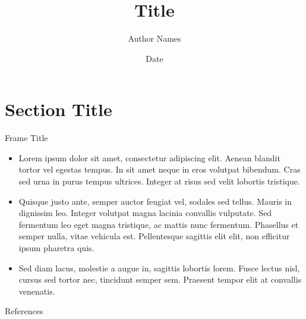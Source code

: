 \documentclass[leqno,presentation]{beamer}
\title[Short Title]{Title}
\author[Short Author Names]{Author Names}
\date[Short Date]{Date}
\begin{document}
\begin{frame}
	\titlepage
\end{frame}

\section{Section Title}
\begin{frame}{Frame Title}
\begin{itemize}
\item Lorem ipsum dolor sit amet, consectetur adipiscing elit. Aenean blandit tortor vel egestas tempus. In sit amet neque in eros volutpat bibendum. Cras sed urna in purus tempus ultrices. Integer at risus sed velit lobortis tristique.
\item Quisque justo ante, semper auctor feugiat vel, sodales sed tellus. Mauris in dignissim leo. Integer volutpat magna lacinia convallis vulputate. Sed fermentum leo eget magna tristique, ac mattis nunc fermentum. Phasellus et semper nulla, vitae vehicula est. Pellentesque sagittis elit elit, non efficitur ipsum pharetra quis.
\item Sed diam lacus, molestie a augue in, sagittis lobortis lorem. Fusce lectus nisl, cursus sed tortor nec, tincidunt semper sem. Praesent tempor elit at convallis venenatis.
\end{itemize}
\end{frame}

\begin{frame}[allowframebreaks]{References}
\end{frame}
\end{document}
